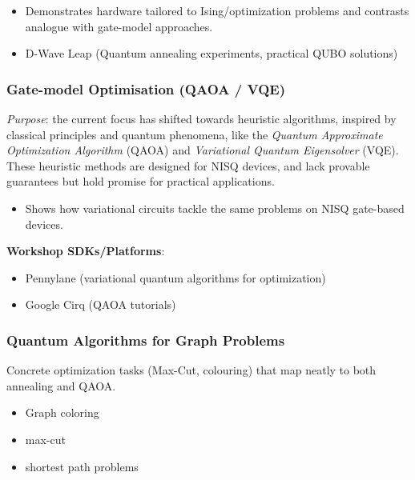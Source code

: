 \begin{itemize}
	\item Demonstrates hardware tailored to Ising/optimization problems and contrasts analogue with gate-model approaches.
 	\item D-Wave Leap (Quantum annealing experiments, practical QUBO solutions)
\end{itemize}

\subsubsection*{Gate-model Optimisation (QAOA / VQE)}

\emph{Purpose}: the current focus has shifted towards heuristic algorithms, inspired by classical principles and quantum phenomena, 
like the \emph{Quantum Approximate Optimization Algorithm} (QAOA) and \emph{Variational Quantum Eigensolver} (VQE).
These heuristic methods are designed for NISQ devices, and lack provable guarantees but hold promise for practical applications.

\begin{itemize}
	\item Shows how variational circuits tackle the same problems on NISQ gate-based devices.
\end{itemize}

\textbf{Workshop SDKs/Platforms}:
\begin{itemize}
	\item Pennylane (variational quantum algorithms for optimization)
	\item Google Cirq (QAOA tutorials)
\end{itemize}

\subsubsection*{Quantum Algorithms for Graph Problems}

Concrete optimization tasks (Max-Cut, colouring) that map neatly to both annealing and QAOA.

\emph{}
\begin{itemize}
	\item Graph coloring
	\item max-cut
	\item shortest path problems
\end{itemize}

